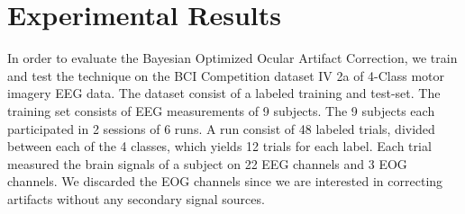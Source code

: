 \section{Experimental Results}
In order to evaluate the Bayesian Optimized Ocular Artifact Correction, we train and test the technique on the BCI Competition dataset IV 2a of 4-Class motor imagery EEG data. The dataset consist of a labeled training and test-set. The training set consists of EEG measurements of 9 subjects. The 9 subjects each participated in 2 sessions of 6 runs. A run consist of 48 labeled trials, divided between each of the 4 classes, which yields 12 trials for each label. Each trial measured the brain signals of a subject on 22 EEG channels and 3 EOG channels. We discarded the EOG channels since we are interested in correcting artifacts without any secondary signal sources.


